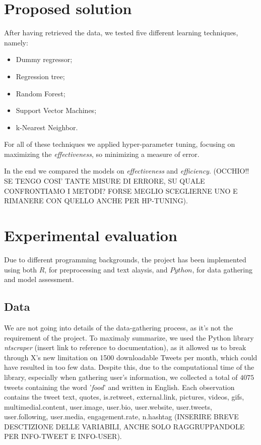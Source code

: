 \documentclass{article}
\begin{document}
\section{Proposed solution}
\label{sec:solution}
After having retrieved the data, we tested five different learning techniques, namely:
\begin{itemize}
    \item Dummy regressor;
    \item Regression tree;
    \item Random Forest;
    \item Support Vector Machines;
    \item k-Nearest Neighbor.
\end{itemize}
For all of these techniques we applied hyper-parameter tuning, focusing on maximizing the \textit{effectiveness}, so minimizing a measure of error.

In the end we compared the models on \textit{effectiveness} and \textit{efficiency}. (OCCHIO!! SE TENGO COSI' TANTE MISURE DI ERRORE, SU QUALE CONFRONTIAMO I METODI? FORSE MEGLIO SCEGLIERNE UNO E RIMANERE CON QUELLO ANCHE PER HP-TUNING).

\section{Experimental evaluation}
\label{sec:exp_evaluation}
Due to different programming backgrounds, the project has been implemented using both $R$, for preprocessing and text alaysis, and $Python$, for data gathering and model assessment.

\subsection{Data}
\label{sec:data}
We are not going into details of the data-gathering process, as it's not the requirement of the project. To maximaly summarize, we used the Python library \textit{ntscraper} (insert link to reference to documentation), as it allowed us to break through X's new limitation on 1500 downloadable Tweets per month, which could have resulted in too few data. Despite this, due to the computational time of the library, especially when gathering user's information, we collected a total of $4075$ tweets containing the word '\textit{food}' and written in English. Each observation contains the tweet text, quotes, is.retweet, external.link, pictures, videos, gifs, multimedial.content, user.image, user.bio, user.website, user.tweets, user.following, user.media, engagement.rate, n.hashtag (INSERIRE BREVE DESCTIZIONE DELLE VARIABILI, ANCHE SOLO RAGGRUPPANDOLE PER INFO-TWEET E INFO-USER).
\end{document}
